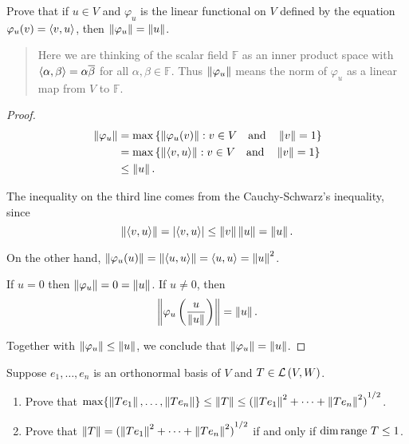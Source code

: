 \begin{exercise}
    Prove that if $u\in V$ and $\varphi_{u}$ is the linear functional on $V$ defined by the equation $\varphi_{u}(v) = \left\langle{v, u}\right\rangle$, then $\left\Vert{\varphi_{u}}\right\Vert = \left\Vert{u}\right\Vert$.
\end{exercise}

\begin{quote}
    Here we are thinking of the scalar field $\mathbb{F}$ as an inner product space with $\left\langle{\alpha, \beta}\right\rangle = \alpha\overline{\beta}$ for all $\alpha, \beta \in \mathbb{F}$. Thus $\left\Vert{\varphi_{u}}\right\Vert$ means the norm of $\varphi_{u}$ as a linear map from $V$ to $\mathbb{F}$.
\end{quote}

\begin{proof}
    \begin{align*}
        \left\Vert{\varphi_{u}}\right\Vert & = \max\left\{ \left\Vert{\varphi_{u}(v)}\right\Vert : v\in V\quad\text{and}\quad\left\Vert{v}\right\Vert = 1 \right\}   \\
                           & = \max\left\{ \left\Vert{\left\langle{v, u}\right\rangle}\right\Vert : v\in V\quad\text{and}\quad\left\Vert{v}\right\Vert = 1 \right\} \\
                           & \leq \left\Vert{u}\right\Vert.
    \end{align*}

    The inequality on the third line comes from the Cauchy-Schwarz's inequality, since
    \[
        \left\Vert{\left\langle{v,u}\right\rangle}\right\Vert = \left\vert{\left\langle{v,u}\right\rangle}\right\vert\leq \left\Vert{v}\right\Vert\left\Vert{u}\right\Vert = \left\Vert{u}\right\Vert.
    \]

    On the other hand, $\left\Vert{\varphi_{u}(u)}\right\Vert = \left\Vert{\left\langle{u, u}\right\rangle}\right\Vert = \left\langle{u,u}\right\rangle = \left\Vert{u}\right\Vert^{2}$.

    If $u = 0$ then $\left\Vert{\varphi_{u}}\right\Vert = 0 = \left\Vert{u}\right\Vert$. If $u\ne 0$, then
    \[
        \left\Vert{\varphi_{u}\left(\frac{u}{\left\Vert{u}\right\Vert}\right)}\right\Vert = \left\Vert{u}\right\Vert.
    \]

    Together with $\left\Vert{\varphi_{u}}\right\Vert \leq \left\Vert{u}\right\Vert$, we conclude that $\left\Vert{\varphi_{u}}\right\Vert = \left\Vert{u}\right\Vert$.
\end{proof}
\newpage

\begin{exercise}
    Suppose $e_{1}, \ldots, e_{n}$ is an orthonormal basis of $V$ and $T \in \mathcal{L}\left({V, W}\right)$.
    \begin{enumerate}[label={(\alph*)}]
        \item Prove that $\max\{ \left\Vert{Te_{1}}\right\Vert, \ldots, \left\Vert{Te_{n}}\right\Vert \}\leq \left\Vert{T}\right\Vert \leq {(\left\Vert{Te_{1}}\right\Vert^{2} + \cdots + \left\Vert{Te_{n}}\right\Vert^{2})}^{1/2}$.
        \item Prove that $\left\Vert{T}\right\Vert = {(\left\Vert{Te_{1}}\right\Vert^{2} + \cdots + \left\Vert{Te_{n}}\right\Vert^{2})}^{1/2}$ if and only if $\dim\operatorname{range}\,{T}\leq 1$.
    \end{enumerate}
\end{exercise}

